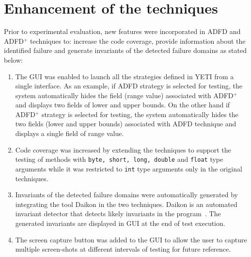 \documentclass[runningheads,a4paper]{llncs}
\begin{document}
\section{Enhancement of the techniques}
Prior to experimental evaluation, new features were incorporated in ADFD and ADFD$^+$ techniques to: increase the code coverage, provide information about the identified failure and generate invariants of the detected failure domains as stated below: 
\begin{enumerate}

\item The GUI was enabled to launch all the strategies defined in YETI from a single interface. As an example, if ADFD strategy is selected for testing, the system automatically hides the field (range value) associated with ADFD$^+$ and displays two fields of lower and upper bounds. On the other hand if ADFD$^+$ strategy is selected for testing, the system automatically hides the two fields (lower and upper bounds) associated with ADFD technique and displays a single field of range value.

\item Code coverage was increased by extending the techniques to support the testing of methods with \verb+byte, short, long, double+ and \verb+float+ type arguments while it was restricted to \verb+int+ type arguments only in the original techniques.

\item Invariants of the detected failure domains were automatically generated by integrating the tool Daikon in the two techniques. Daikon is an automated invariant detector that detects likely invariants in the program~\cite{ernst2007daikon}. The generated invariants are displayed in GUI at the end of test execution. 

\item The screen capture button was added to the GUI to allow the user to capture multiple screen-shots at different intervals of testing for future reference. 

\end{enumerate}



\end{document}
